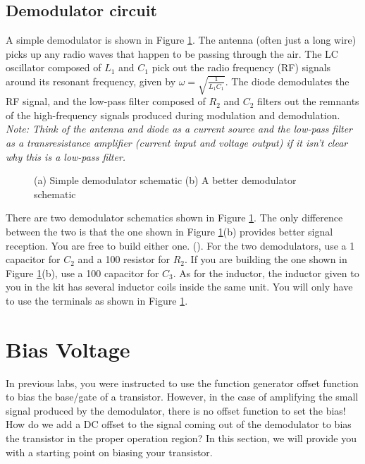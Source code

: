 \documentclass{article}
\begin{document}
\subsection{Demodulator circuit}

A simple demodulator is shown in Figure \ref{demodschematic}. The antenna (often just a long wire) picks up any radio waves that happen to be passing through the air. The LC oscillator composed of $L_1$ and $C_1$ pick out the radio frequency (RF) signals around its resonant frequency, given by $\omega = \sqrt{\frac{1}{L_1 C_1}}$. The diode demodulates the RF signal, and the low-pass filter composed of $R_2$ and $C_2$ filters out the remnants of the high-frequency signals produced during modulation and demodulation. \textit{Note: Think of the antenna and diode as a current source and the low-pass filter as a transresistance amplifier (current input and voltage output) if it isn't clear why this is a low-pass filter.}

\begin{figure}[!htb]
  
  \centerline{\box\graph}
  \caption{(a) Simple demodulator schematic  (b) A better demodulator schematic}
  \label{demodschematic}
\end{figure}

There are two demodulator schematics shown in Figure \ref{demodschematic}. The only difference between the two is that the one shown in Figure \ref{demodschematic}(b) provides better signal reception. You are free to build either one. (). For the two demodulators, use a \unit{1}{\nano\farad} capacitor for $C_2$ and a \unit{100}{\kilo\ohm} resistor for $R_2$. If you are building the one shown in Figure \ref{demodschematic}(b), use a \unit{100}{\pico\farad} capacitor for $C_3$. As for the inductor, the inductor given to you in the kit has several inductor coils inside the same unit. You will only have to use the terminals as shown in Figure \ref{demodschematic}. 

\section{Bias Voltage}

In previous labs, you were instructed to use the function generator offset function to bias the base/gate of a transistor. However, in the case of amplifying the small signal produced by the demodulator, there is no offset function to set the bias! How do we add a DC offset to the signal coming out of the demodulator to bias the transistor in the proper operation region? In this section, we will provide you with a starting point on biasing your transistor.
\end{document}
